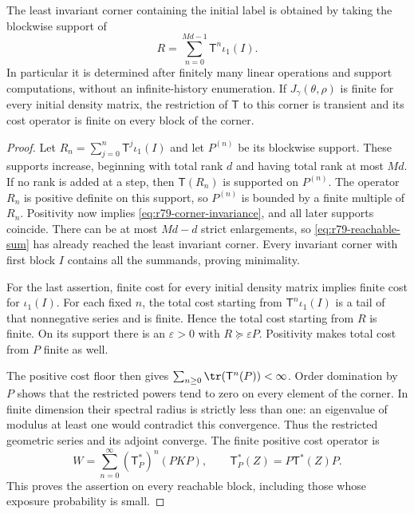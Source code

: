 \begin{lemma}
\label{lem:r79-reachable-corner}
The least invariant corner containing the initial label is obtained
by taking the blockwise support of
\begin{equation}\label{eq:r79-reachable-sum}
 R=\sum_{n=0}^{Md-1}\mathsf T^n\iota_1(I).
\end{equation}
In particular it is determined after finitely many linear operations
and support computations, without an infinite-history enumeration.
If $J_\gamma(\theta,\rho)$ is finite for every initial density matrix,
the restriction of $\mathsf T$ to this corner is transient and its
cost operator is finite on every block of the corner.
\end{lemma}
\begin{proof}
Let $R_n=\sum_{j=0}^n\mathsf T^j\iota_1(I)$ and let $P^{(n)}$
be its blockwise support.  These supports increase, beginning with
total rank $d$ and having total rank at most $Md$.  If no rank is
added at a step, then $\mathsf T(R_n)$ is supported on $P^{(n)}$.
The operator $R_n$ is positive definite on this support, so
$P^{(n)}$ is bounded by a finite multiple of $R_n$.  Positivity now
implies \eqref{eq:r79-corner-invariance}, and all later supports
coincide.  There can be at most $Md-d$ strict enlargements, so
\eqref{eq:r79-reachable-sum} has already reached the least invariant
corner.  Every invariant corner with first block $I$ contains all
the summands, proving minimality.

For the last assertion, finite cost for every initial density matrix
implies finite cost for $\iota_1(I)$.  For each fixed $n$, the total
cost starting from $\mathsf T^n\iota_1(I)$ is a tail of that
nonnegative series and is finite.  Hence the total cost starting
from $R$ is finite.  On its support there is an $\varepsilon>0$
with $R\succeq\varepsilon P$.  Positivity makes total cost from
$P$ finite as well.

The positive cost floor then gives
$\sum_{n\ge0}\tr(\mathsf T^n(P))<\infty$.
Order domination by $P$ shows that the restricted powers tend to
zero on every element of the corner.  In finite dimension their
spectral radius is strictly less than one: an eigenvalue of modulus
at least one would contradict this convergence.  Thus the restricted
geometric series and its adjoint converge.  The finite positive
cost operator is
\[
 W=\sum_{n=0}^\infty (\mathsf T_P^*)^n(PKP),
 \qquad \mathsf T_P^*(Z)=P\mathsf T^*(Z)P.
\]
This proves the assertion on every reachable block, including those
whose exposure probability is small.
\end{proof}

